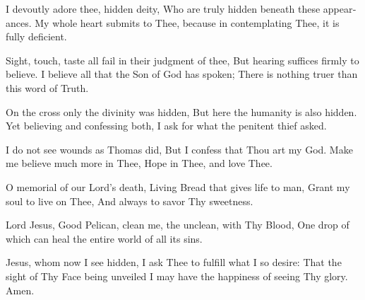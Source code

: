 \begin{otherlanguage}{english}I devoutly adore thee, hidden deity,
Who are truly hidden beneath these appearances.
My whole heart submits to Thee,
because in contemplating Thee, it is fully deficient.

Sight, touch, taste all fail in their judgment of thee,
But hearing suffices firmly to believe.
I believe all that the Son of God has spoken;
There is nothing truer than this word of Truth.

On the cross only the divinity was hidden,
But here the humanity is also hidden.
Yet believing and confessing both,
I ask for what the penitent thief asked.

I do not see wounds as Thomas did,
But I confess that Thou art my God.
Make me believe much more in Thee,
Hope in Thee, and love Thee.

O memorial of our Lord's death,
Living Bread that gives life to man,
Grant my soul to live on Thee,
And always to savor Thy sweetness.

Lord Jesus, Good Pelican,
clean me, the unclean, with Thy Blood,
One drop of which can heal
the entire world of all its sins.

Jesus, whom now I see hidden,
I ask Thee to fulfill what I so desire:
That the sight of Thy Face being unveiled
I may have the happiness of seeing Thy glory. Amen.
\end{otherlanguage}